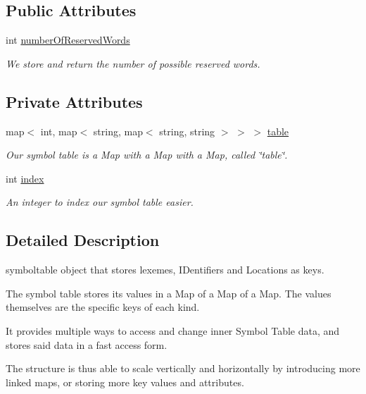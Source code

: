 \subsection*{Public Attributes}
\begin{DoxyCompactItemize}
\item 
int \hyperlink{classSymbolTable_ac98627cea258b0931be5286aacb1f478}{numberOfReservedWords}
\begin{DoxyCompactList}\small\item\em We store and return the number of possible reserved words. \end{DoxyCompactList}\end{DoxyCompactItemize}
\subsection*{Private Attributes}
\begin{DoxyCompactItemize}
\item 
map$<$ int, map$<$ string, map$<$ string, string $>$ $>$ $>$ \hyperlink{classSymbolTable_a96f585bb42df3aad2e833e95681f0727}{table}
\begin{DoxyCompactList}\small\item\em Our symbol table is a Map with a Map with a Map, called \char`\"{}table\char`\"{}. \end{DoxyCompactList}\item 
int \hyperlink{classSymbolTable_a6e85689256b178941b87f51e570a6c1e}{index}
\begin{DoxyCompactList}\small\item\em An integer to index our symbol table easier. \end{DoxyCompactList}\end{DoxyCompactItemize}


\subsection{Detailed Description}
symboltable object that stores lexemes, IDentifiers and Locations as keys. 

The symbol table stores its values in a Map of a Map of a Map. The values themselves are the specific keys of each kind.

It provides multiple ways to access and change inner Symbol Table data, and stores said data in a fast access form.

The structure is thus able to scale vertically and horizontally by introducing more linked maps, or storing more key values and attributes.

